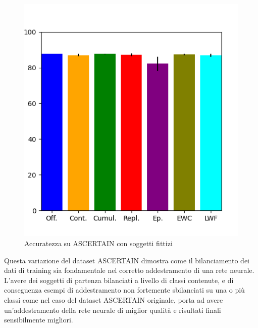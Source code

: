 \begin{figure}[!tbp]
\begin{minipage}[b]{0.5\textwidth}
		\includegraphics[width=\textwidth]{img/graphs/customascertain_final_accuracy.png}
		\caption{Accuratezza su ASCERTAIN con soggetti fittizi}
		\label{fig:customascertain_accuracy_graph}
	\end{minipage}
\end{figure}
Questa variazione del dataset ASCERTAIN dimostra come il bilanciamento dei dati di training sia fondamentale nel corretto addestramento di una rete neurale. L'avere dei soggetti di partenza bilanciati a livello di classi contenute, e di conseguenza esempi di addestramento non fortemente sbilanciati su una o più classi come nel caso del dataset ASCERTAIN originale, porta ad avere un'addestramento della rete neurale di miglior qualità e risultati finali sensibilmente migliori.